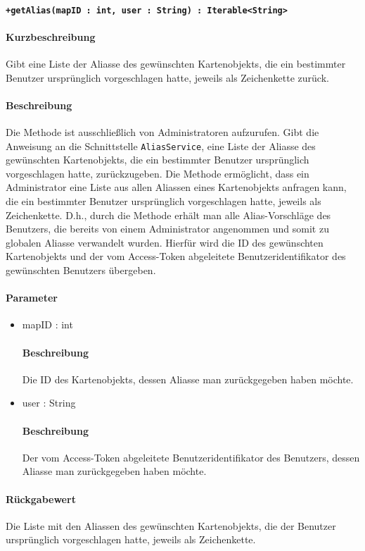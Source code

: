 \paragraph*{\texttt{+getAlias(mapID : int, user : String) : Iterable<String>}}%
\paragraph*{Kurzbeschreibung}
Gibt eine Liste der Aliasse des gewünschten Kartenobjekts, die ein bestimmter Benutzer ursprünglich vorgeschlagen hatte, jeweils als Zeichenkette zurück.
\paragraph*{Beschreibung}
Die Methode ist ausschließlich von Administratoren aufzurufen.
Gibt die Anweisung an die Schnittstelle \texttt{AliasService}, eine Liste der Aliasse des gewünschten Kartenobjekts, die ein bestimmter Benutzer ursprünglich vorgeschlagen hatte, zurückzugeben.
Die Methode ermöglicht, dass ein Administrator eine Liste aus allen Aliassen eines Kartenobjekts anfragen kann, die ein bestimmter Benutzer ursprünglich vorgeschlagen hatte, jeweils als Zeichenkette.
D.h., durch die Methode erhält man alle Alias-Vorschläge des Benutzers, die bereits von einem Administrator angenommen und somit zu globalen Aliasse verwandelt wurden.
Hierfür wird die ID des gewünschten Kartenobjekts und der vom Access-Token abgeleitete Benutzeridentifikator des gewünschten Benutzers übergeben.
\paragraph*{Parameter}
\begin{itemize}
    \item mapID : int
    		\paragraph*{Beschreibung}
    		Die ID des Kartenobjekts, dessen Aliasse man zurückgegeben haben möchte.
    	\item user : String
    		\paragraph*{Beschreibung}
    		Der vom Access-Token abgeleitete Benutzeridentifikator des Benutzers, dessen Aliasse man zurückgegeben haben möchte.
\end{itemize}
\paragraph*{Rückgabewert}
Die Liste mit den Aliassen des gewünschten Kartenobjekts, die der Benutzer ursprünglich vorgeschlagen hatte, jeweils als Zeichenkette.
